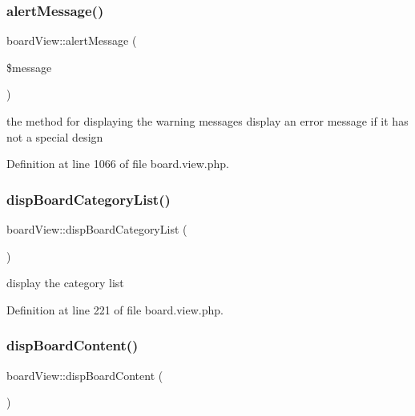 \subsubsection{\texorpdfstring{alert\+Message()}{alertMessage()}}
{\footnotesize\ttfamily board\+View\+::alert\+Message (\begin{DoxyParamCaption}\item[{}]{\$message }\end{DoxyParamCaption})}



the method for displaying the warning messages display an error message if it has not a special design 



Definition at line 1066 of file board.\+view.\+php.

\hypertarget{classboardView_a94785091050c4d88f6fa03c94c6a59e0}{}\label{classboardView_a94785091050c4d88f6fa03c94c6a59e0} 
\subsubsection{\texorpdfstring{disp\+Board\+Category\+List()}{dispBoardCategoryList()}}
{\footnotesize\ttfamily board\+View\+::disp\+Board\+Category\+List (\begin{DoxyParamCaption}{ }\end{DoxyParamCaption})}



display the category list 



Definition at line 221 of file board.\+view.\+php.

\hypertarget{classboardView_a713010ff8458ff4e7970878eeda17e20}{}\label{classboardView_a713010ff8458ff4e7970878eeda17e20} 
\subsubsection{\texorpdfstring{disp\+Board\+Content()}{dispBoardContent()}}
{\footnotesize\ttfamily board\+View\+::disp\+Board\+Content (\begin{DoxyParamCaption}{ }\end{DoxyParamCaption})}



